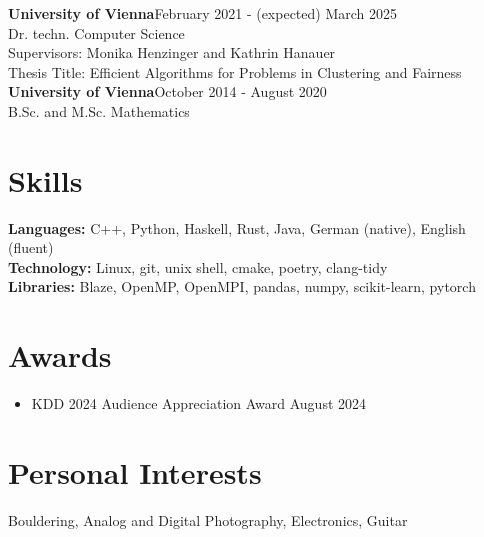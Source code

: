 \documentclass[a4paper, 10pt]{article}
\newcommand{\secStartSpace}{\vspace{3pt}}
\newcommand{\secEndSpace}{\vspace{5pt}}
\begin{document}
\begin{addmargin}[0.5em]{1em}
	\large\textbf{University of Vienna}\hfill \normalsize{February 2021 - (expected) March 2025}\\
	\setlength\parindent{1cm} Dr. techn. Computer Science\\
	Supervisors: Monika Henzinger and Kathrin Hanauer\\
	\vspace{8pt}\hspace{-2pt}
	Thesis Title: Efficient Algorithms for Problems in Clustering and Fairness\\
	\large\textbf{University of Vienna}\hfill \normalsize{October 2014 - August 2020}\\
	\setlength\parindent{1cm} B.Sc. and M.Sc. Mathematics\\
\end{addmargin}
\secEndSpace
\secEndSpace


\section{\color{highlight} \textbf{Skills}}
\secStartSpace

\begin{addmargin}[0.5em]{1em}
	\noindent \textbf{Languages:} C++, Python, Haskell, Rust, Java, German (native), English (fluent) \\
	\noindent \textbf{Technology:} Linux, git, unix shell, cmake, poetry, clang-tidy \\
	\noindent \textbf{Libraries:} Blaze, OpenMP, OpenMPI, pandas, numpy, scikit-learn, pytorch \\
\end{addmargin}
\secEndSpace
\secEndSpace


\section{\color{highlight} \textbf{Awards}}
\secStartSpace

\begin{addmargin}[0.5em]{1em}
    \begin{itemize}[itemsep=-2.25pt, leftmargin=1.5em]
		\item KDD 2024 Audience Appreciation Award \hfill August 2024
    \end{itemize}
\end{addmargin}
\secEndSpace
\secEndSpace

\section{\color{highlight} \textbf{Personal Interests}}
\secStartSpace
\begin{addmargin}[0.5em]{1em}
	Bouldering, Analog and Digital Photography, Electronics, Guitar
\end{addmargin}
\end{document}
